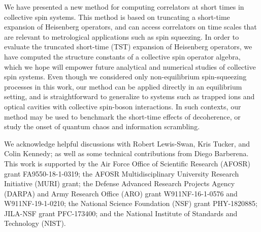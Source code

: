 \documentclass[aps,pra,twocolumn,longbibliography]{revtex4-2}
\newcommand{\1}{\mathds{1}}
\begin{document}
We have presented a new method for computing correlators at short
times in collective spin systems.  This method is based on truncating
a short-time expansion of Heisenberg operators, and can access
correlators on time scales that are relevant to metrological
applications such as spin squeezing.  In order to evaluate the
truncated short-time (TST) expansion of Heisenberg operators, we have
computed the structure constants of a collective spin operator
algebra, which we hope will empower future analytical and numerical
studies of collective spin systems.  Even though we considered only
non-equilibrium spin-squeezing processes in this work, our method can
be applied directly in an equilibrium setting, and is straightforward
to generalize to systems such as trapped ions and optical cavities
with collective spin-boson interactions.  In such contexts, our method
may be used to benchmark the short-time effects of decoherence, or
study the onset of quantum chaos and information scrambling.


\begin{acknowledgments}
  We acknowledge helpful discussions with Robert Lewis-Swan, Kris
  Tucker, and Colin Kennedy; as well as some technical contributions
  from Diego Barberena.  This work is supported by the Air Force
  Office of Scientific Research (AFOSR) grant FA9550-18-1-0319; the
  AFOSR Multidisciplinary University Research Initiative (MURI) grant;
  the Defense Advanced Research Projects Agency (DARPA) and Army
  Research Office (ARO) grant W911NF-16-1-0576 and W911NF-19-1-0210;
  the National Science Foundation (NSF) grant PHY-1820885; JILA-NSF
  grant PFC-173400; and the National Institute of Standards and
  Technology (NIST).
\end{acknowledgments}

\vfill
\onecolumngrid
\appendix











% 


\end{document}
